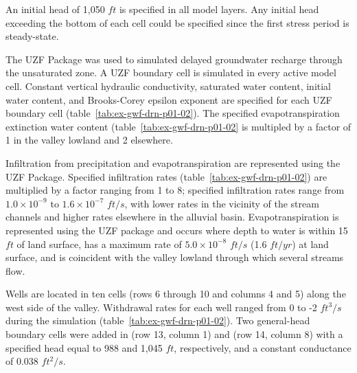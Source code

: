 An initial head of 1,050 $ft$ is specified in all model layers. Any initial head exceeding the bottom of each cell could be specified since the first stress period is steady-state.

The UZF Package was used to simulated delayed groundwater recharge through the unsaturated zone. A UZF boundary cell is simulated in every active model cell. Constant vertical hydraulic conductivity, saturated water content, initial water content, and Brooks-Corey epsilon exponent \citep{brookscorey1966} are specified for each UZF boundary cell (table~\ref{tab:ex-gwf-drn-p01-02}). The specified evapotranspiration extinction water content (table~\ref{tab:ex-gwf-drn-p01-02} is multipled by a factor of 1 in the valley lowland and 2 elsewhere. 



Infiltration from precipitation and evapotranspiration are represented using the UZF Package. Specified infiltration rates (table~\ref{tab:ex-gwf-drn-p01-02}) are multiplied by a factor ranging from 1 to 8; specified infiltration rates range from $1.0 \times 10^{-9}$ to $1.6 \times 10^{-7}$ $ft/s$, with lower rates in the vicinity of the stream channels and higher rates elsewhere in the alluvial basin. Evapotranspiration is represented using the UZF package and occurs where depth to water is within 15 $ft$ of land surface, has a maximum rate of $5.0 \times 10^{-8}$ $ft/s$ (1.6 $ft/yr$) at land surface, and is coincident with the valley lowland through which several streams flow. 

Wells are  located in ten cells (rows 6 through 10 and columns 4 and 5) along the west side of the valley. Withdrawal rates for each well ranged from 0 to -2 $ft^{3}/s$ during the simulation (table~\ref{tab:ex-gwf-drn-p01-02}). Two general-head boundary cells were added in (row 13, column 1) and (row 14, column 8) with a specified head equal to 988 and 1,045 $ft$, respectively, and a constant conductance of 0.038 $ft^{2}/s$.

